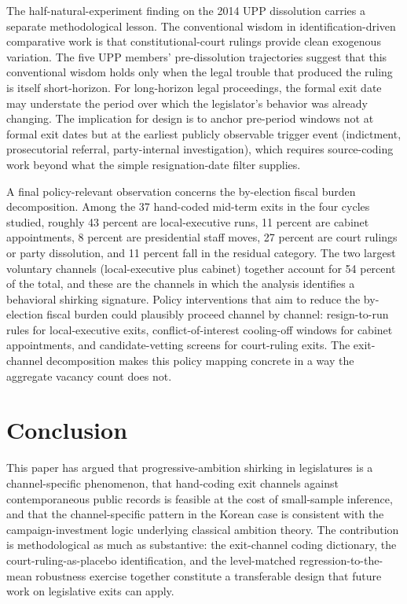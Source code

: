 \documentclass[11pt]{article}
\begin{document}
The half-natural-experiment finding on the 2014 UPP dissolution carries a separate methodological lesson. The conventional wisdom in identification-driven comparative work is that constitutional-court rulings provide clean exogenous variation. The five UPP members' pre-dissolution trajectories suggest that this conventional wisdom holds only when the legal trouble that produced the ruling is itself short-horizon. For long-horizon legal proceedings, the formal exit date may understate the period over which the legislator's behavior was already changing. The implication for design is to anchor pre-period windows not at formal exit dates but at the earliest publicly observable trigger event (indictment, prosecutorial referral, party-internal investigation), which requires source-coding work beyond what the simple resignation-date filter supplies.

A final policy-relevant observation concerns the by-election fiscal burden decomposition. Among the 37 hand-coded mid-term exits in the four cycles studied, roughly 43 percent are local-executive runs, 11 percent are cabinet appointments, 8 percent are presidential staff moves, 27 percent are court rulings or party dissolution, and 11 percent fall in the residual category. The two largest voluntary channels (local-executive plus cabinet) together account for 54 percent of the total, and these are the channels in which the analysis identifies a behavioral shirking signature. Policy interventions that aim to reduce the by-election fiscal burden could plausibly proceed channel by channel: resign-to-run rules for local-executive exits, conflict-of-interest cooling-off windows for cabinet appointments, and candidate-vetting screens for court-ruling exits. The exit-channel decomposition makes this policy mapping concrete in a way the aggregate vacancy count does not.

\section{Conclusion}\label{sec:conclusion}

This paper has argued that progressive-ambition shirking in legislatures is a channel-specific phenomenon, that hand-coding exit channels against contemporaneous public records is feasible at the cost of small-sample inference, and that the channel-specific pattern in the Korean case is consistent with the campaign-investment logic underlying classical ambition theory. The contribution is methodological as much as substantive: the exit-channel coding dictionary, the court-ruling-as-placebo identification, and the level-matched regression-to-the-mean robustness exercise together constitute a transferable design that future work on legislative exits can apply.
\end{document}
